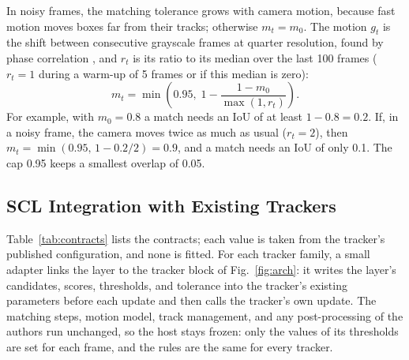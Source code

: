 \documentclass[pdflatex,sn-mathphys-num,iicol]{sn-jnl}
\begin{document}
In noisy frames, the matching tolerance grows with camera motion, because fast motion moves boxes
far from their tracks; otherwise $m_t=m_0$. The motion $g_t$ is the shift between consecutive
grayscale frames at quarter resolution, found by phase correlation \cite{reddy1996phasecorr}, and
$r_t$ is its ratio to its median over the last 100 frames ($r_t=1$ during a warm-up of 5 frames or
if this median is zero):
\begin{equation}
m_t=\min\!\left(0.95,\;1-\frac{1-m_0}{\max(1,r_t)}\right).
\label{eq:motion}
\end{equation}
For example, with $m_0=0.8$ a match needs an IoU of at least $1-0.8=0.2$. If, in a noisy frame,
the camera moves twice as much as usual ($r_t=2$), then $m_t=\min(0.95,\,1-0.2/2)=0.9$, and a match
needs an IoU of only 0.1. The cap 0.95 keeps a smallest overlap of 0.05.

\subsection{SCL Integration with Existing Trackers}\label{sec:contract}
Table~\ref{tab:contracts} lists the contracts; each value is taken from the tracker's published
configuration, and none is fitted. For each tracker family, a small adapter links the layer to the
tracker block of Fig.~\ref{fig:arch}: it writes the layer's candidates, scores, thresholds, and
tolerance into the tracker's existing parameters before each update and then calls the tracker's
own update. The matching steps, motion model, track management, and any post-processing of the
authors run unchanged, so the host stays frozen: only the values of its thresholds are set for
each frame, and the rules are the same for every tracker.
\end{document}
